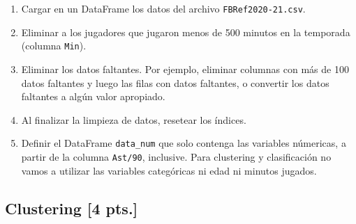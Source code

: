 \documentclass[a4paper,11pt]{article}
\theoremstyle{definition}
\begin{document}
\begin{enumerate}
\item Cargar en un DataFrame los datos del archivo \lstinline{FBRef2020-21.csv}.
\item Eliminar a los jugadores que jugaron menos de 500 minutos en la temporada (columna \lstinline{Min}).
\item Eliminar los datos faltantes. Por ejemplo, eliminar columnas con más de 100 datos faltantes y luego las filas con datos faltantes, o convertir los datos faltantes a algún valor apropiado.
\item Al finalizar la limpieza de datos, resetear los índices.
\item Definir el DataFrame \lstinline{data_num} que solo contenga las variables númericas, a partir de la columna
\lstinline{Ast/90}, inclusive.
Para clustering y clasificación no vamos a utilizar las variables categóricas ni edad ni minutos jugados.
\end{enumerate}

\subsection*{Clustering [4 pts.]}
\end{document}
